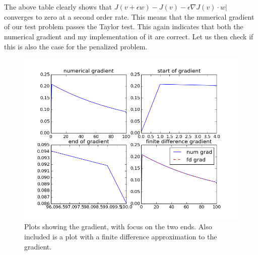 \\
\\
The above table clearly shows that $J(v+\epsilon w)-J(v)-\epsilon \nabla J(v)\cdot w|$ converges to zero at a second order rate. This means that the numerical gradient of our test problem passes the Taylor test. This again indicates that both the numerical gradient and my implementation of it are correct. Let us then check if this is also the case for the penalized problem.
\begin{figure}[h]
\caption{Plots showing the gradient, with focus on the two ends. Also included is a plot with a finite difference approximation to the gradient.}
\centering
\includegraphics[scale=0.5]{num_grad.png}
\end{figure}
